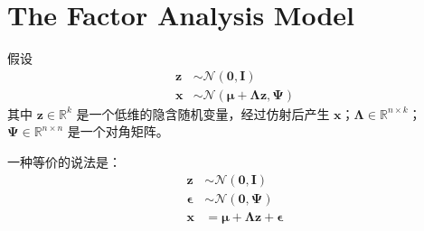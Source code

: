 	\section{The Factor Analysis Model}	
		假设 
		\begin{align*}
			\bm{z} &\sim \mathcal{N}(\bm{0}, \bm{I}) \\
			\bm{x} &\sim \mathcal{N}(\bm{\mu} + \bm{\Lambda z}, \bm{\Psi})
		\end{align*}
		其中 $ \bm{z} \in \mathbb{R}^k $ 是一个低维的隐含随机变量，经过仿射后产生 $ \bm{x} $；$ \bm{\Lambda} \in \mathbb{R}^{n \times k} $；
		$ \bm{\Psi} \in \mathbb{R}^{n \times n} $ 是一个对角矩阵。
		
		一种等价的说法是：
		\begin{align}
			\bm{z} &\sim \mathcal{N}(\bm{0}, \bm{I}) \\
			\bm{\epsilon} &\sim \mathcal{N}(\bm{0}, \bm{\Psi}) \\
			\bm{x} &= \bm{\mu} + \bm{\Lambda z} + \bm{\epsilon}
		\end{align}
		
